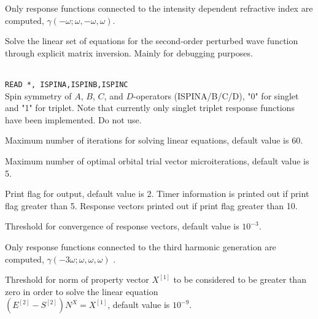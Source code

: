 \begin{description}
\item{}
Only response functions connected to the intensity dependent
refractive index are computed,
$\gamma(-\omega;\omega,-\omega,\omega)$.

\item{} Solve the linear set of equations for the
  second-order perturbed wave function through explicit matrix
  inversion. Mainly for debugging purposes.

\item{}\\
\verb|READ *, ISPINA,ISPINB,ISPINC|\\
Spin symmetry of $A$, $B$, $C$, and $D$-operators (ISPINA/B/C/D),
"0" for singlet and "1" for triplet. Note that currently only singlet
triplet response functions have been implemented. Do not use.

\item{}
Maximum number of iterations for solving linear equations, default value is 60.

\item{}
Maximum number of optimal orbital trial vector microiterations,
default value is 5.

\item{}
Print flag for output, default value is 2. Timer information is printed
out if print flag greater than 5. Response vectors printed out if
print flag greater than 10.

\item{}
Threshold for convergence of response vectors, default value is $10^{-3}$.

\item{}
Only response functions connected to the third harmonic
generation are
computed, $\gamma(-3\omega;\omega,\omega,\omega)$ \cite{djpnylhajcp105}.

\item{}
Threshold for norm of property vector $X^{[1]}$ to be considered to be
greater than zero in order to solve the linear
equation \\
$\left( E^{[2]} - S^{[2]} \right)N^{X} = X^{[1]}$, default
value is $10^{-9}$.



\end{description}

